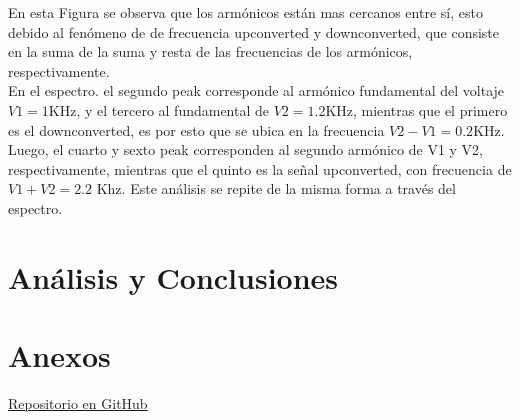 \documentclass[letterpaper,oneside]{article}
\begin{document}
En esta Figura se observa que los armónicos están mas cercanos entre sí, esto debido al fenómeno de de frecuencia upconverted y downconverted, que consiste en la suma de la suma y resta de las frecuencias de los armónicos, respectivamente.\\

En el espectro. el segundo peak corresponde al armónico fundamental del voltaje $V1 = 1$KHz, y el tercero al fundamental de $V2=1.2$KHz, mientras que el primero es el downconverted, es por esto que se ubica en la frecuencia $V2 - V1 = 0.2$KHz. Luego, el cuarto y sexto peak corresponden al segundo armónico de V1 y V2, respectivamente, mientras que el quinto es la señal upconverted, con frecuencia de $V1+ V2 = 2.2$ Khz. Este análisis se repite de la misma forma a través del espectro.

\section{Análisis y Conclusiones}

\section{Anexos}
\href{https://github.com/vecheto/astro_experimental/tree/main/Tarea\%202}{Repositorio en GitHub}
\end{document}
